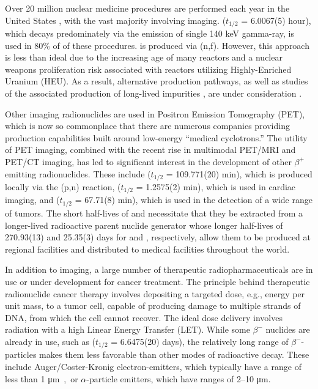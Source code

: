 \documentclass[letterpaper]{ar-1col}
\newcommand{\mmicro}{\si\micro}
\begin{document}
Over 20 million nuclear medicine procedures are performed each year in the United States \cite{Met09}, with the vast majority involving imaging.
  ($t_{1/2}$ = 6.0067(5) hour), which decays predominately via the emission of single 140 keV gamma-ray, is used in 80\% of of these procedures.
 is produced via (n,f).
 However, this approach is less than ideal due to the increasing age of many reactors \cite{Qai12} and a nuclear weapons proliferation risk associated with reactors utilizing Highly-Enriched Uranium (HEU).
 As a result, alternative  production pathways, as well as studies of the associated production of long-lived impurities \cite{Updegraff2013}, are under consideration \cite{Rut09}.



Other imaging radionuclides are used in Positron Emission Tomography (PET), which is now so commonplace that
there are numerous companies   providing production capabilities built around low-energy \enquote{medical cyclotrons.} 
The utility of PET imaging, combined with the recent rise in multimodal PET/MRI and PET/CT imaging,  has
led to significant interest in the development of other $\beta^+$ emitting radionuclides.
These include  ($t_{1/2}$ = 109.771(20) min), which is produced locally via the (p,n) reaction,  ($t_{1/2}$ = 1.2575(2) min), which is used in cardiac imaging, and   ($t_{1/2}$ = 67.71(8) min), which is used in the detection of a wide range of tumors.
 The short half-lives of   and  necessitate that they be extracted from a longer-lived radioactive parent nuclide generator whose longer half-lives of 270.93(13) and 25.35(3) days for  and , respectively, allow them to be produced at regional facilities and distributed to medical facilities throughout the world.
 

In addition to imaging, a large number of therapeutic radiopharmaceuticals are in use or under development for cancer treatment.
 The principle behind therapeutic radionuclide cancer therapy involves depositing a targeted dose, e.g., energy per unit mass, to a tumor cell,  capable of producing damage to multiple strands of DNA, from which the cell cannot recover.
 The ideal dose delivery involves radiation with a high Linear Energy Transfer (LET).
 While some $\beta^-$ nuclides are already in use, such as  ($t_{1/2}$ = 6.6475(20) days), the relatively long range of $\beta^-$-particles makes them less favorable than other modes of radioactive decay.
 These include Auger/Coster-Kronig electron-emitters, which typically have a range of less than 1 \mmicro m, or $\alpha$-particle emitters, which have ranges of 2--10 \mmicro m.
 
\end{document}

